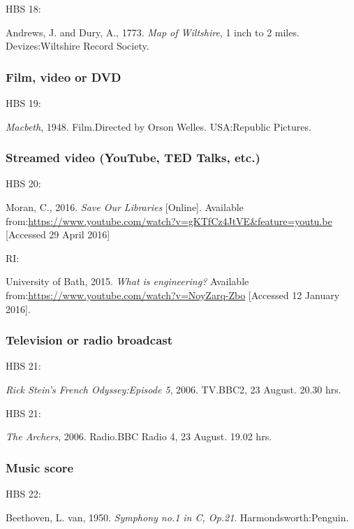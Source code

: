 HBS 18: \cite{andrews.dury1773wilts}

Andrews, J. and Dury, A., 1773. \emph{Map of Wiltshire}, 1 inch to 2 miles. Devizes:\@ Wiltshire Record Society.



\subsubsection*{Film, video or DVD}

HBS 19: \cite{macbeth1948}

\emph{Macbeth}, 1948. Film.\@ Directed by Orson Welles. USA:\@ Republic Pictures.



\subsubsection*{Streamed video (YouTube, TED Talks, etc.)}

HBS 20: \cite{moran2016sol}

Moran, C., 2016. \emph{Save Our Libraries} [Online]. Available from:\@ \url{https://www.youtube.com/watch?v=gKTfCz4JtVE&feature=youtu.be} [Accessed 29 April 2016]


RI: \cite{uob2015wie}

University of Bath, 2015. \emph{What is engineering?} Available from:\@ \url{https://www.youtube.com/watch?v=NoyZarq-Zbo} [Accessed 12 January 2016].



\subsubsection*{Television or radio broadcast}

HBS 21: \cite{rsfo2006ep5}

\emph{Rick Stein's French Odyssey:\@ Episode 5}, 2006. TV.\@ BBC2, 23 August. 20.30 hrs.



HBS 21: \cite{archers20060823}

\emph{The Archers}, 2006. Radio.\@ BBC Radio 4, 23 August. 19.02 hrs.



\subsubsection*{Music score}

HBS 22: \cite{beethoven1950symph1}

Beethoven, L. van, 1950. \emph{Symphony no.1 in C, Op.21}. Harmondsworth:\@ Penguin.



